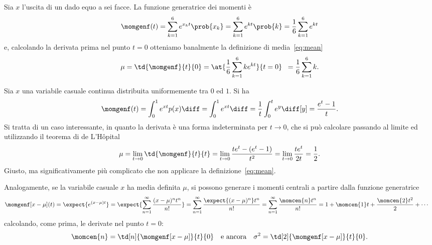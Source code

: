 \begin{examplebox}
  \begin{example}
    Sia $x$ l'uscita di un dado equo a sei facce. La funzione generatrice dei
    momenti è
    \begin{align*}
      \momgenf(t) = \sum_{k = 1}^{6} e^{x_kt} \prob{x_k} =
      \sum_{k = 1}^{6} e^{kt} \prob{k} =
      \frac{1}{6}\sum_{k = 1}^{6} e^{kt}
    \end{align*}
    e, calcolando la derivata prima nel punto $t = 0$ otteniamo banalmente
    la definizione di media~\eqref{eq:mean}
    \begin{align*}
      \mu = \td{\momgenf}{t}{0} =
      \at{\frac{1}{6} \sum_{k = 1}^{6} ke^{kt}}{t = 0}\mkern10mu = 
      \frac{1}{6} \sum_{k = 1}^{6} k.
    \end{align*}
  \end{example}
  
  \begin{example}
    Sia $x$ una variabile casuale continua distribuita uniformemente tra $0$ ed
    $1$. Si ha
    \begin{align*}
      \momgenf(t) = \int_{0}^{1}e^{xt}p(x) \diff =
      \int_{0}^{1}e^{xt} \diff = \frac{1}{t} \int_{0}^{t} e^y \diff[y] =
      \frac{e^t - 1}{t}.
    \end{align*}
    Si tratta di un caso interessante, in quanto la derivata è una forma
    indeterminata per $t \rightarrow 0$, che si può calcolare passando al
    limite ed utilizzando il teorema di de L'H\^opital
    \begin{align*}
      \mu = \lim_{t \rightarrow 0} \td{\momgenf}{t}{t} =
      \lim_{t \rightarrow 0} \frac{te^t - (e^t - 1)}{t^2} =
      \lim_{t \rightarrow 0} \frac{te^t}{2t} = \frac{1}{2}.
    \end{align*}
    Giusto, ma significativamente più complicato che non applicare la
    definizione~\eqref{eq:mean}.
  \end{example}
\end{examplebox}

Analogamente, se la variabile casuale $x$ ha media definita $\mu$, si possono
generare i momenti centrali a partire dalla funzione generatrice
\begin{align*}
  \momgenf[x - \mu](t) & = \expect{e^{(x - \mu)t}} =
  \expect{\sum_{n = 1}^{\infty} \frac{(x-\mu)^nt^n}{n!}} =
  \sum_{n = 1}^{\infty} \frac{\expect{(x - \mu)^n}t^n}{n!} =
  \sum_{n = 1}^{\infty} \frac{\momcen{n}t^n}{n!} =
  1 + \momcen{1}t + \frac{\momcen{2}t^2}{2} + \cdots
\end{align*}
calcolando, come prima, le derivate nel punto $t = 0$:
\begin{align} 
  \momcen{n} = \td[n]{\momgenf[x - \mu]}{t}{0}
  \quad\text{e ancora}\quad
  \sigma^2 = \td[2]{\momgenf[x - \mu]}{t}{0}.
\end{align}


